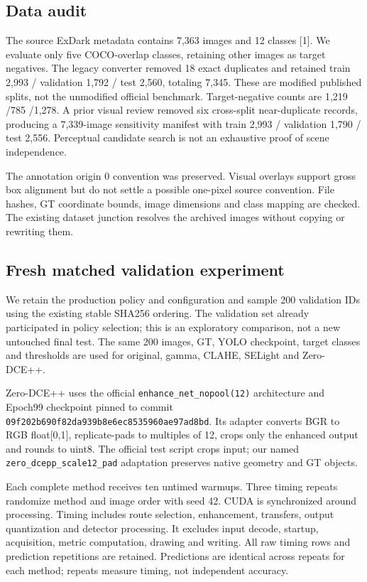 \documentclass[11pt,a4paper]{article}
\begin{document}
\subsection{Data audit}

The source ExDark metadata contains 7,363 images and 12 classes [1]. We evaluate only five COCO-overlap classes, retaining other images as target negatives. The legacy converter removed 18 exact duplicates and retained train 2,993 / validation 1,792 / test 2,560, totaling 7,345. These are modified published splits, not the unmodified official benchmark. Target-negative counts are 1,219 /785 /1,278. A prior visual review removed six cross-split near-duplicate records, producing a 7,339-image sensitivity manifest with train 2,993 / validation 1,790 / test 2,556. Perceptual candidate search is not an exhaustive proof of scene independence.


The annotation origin 0 convention was preserved. Visual overlays support gross box alignment but do not settle a possible one-pixel source convention. File hashes, GT coordinate bounds, image dimensions and class mapping are checked. The existing dataset junction resolves the archived images without copying or rewriting them.


\subsection{Fresh matched validation experiment}

We retain the production policy and configuration and sample 200 validation IDs using the existing stable SHA256 ordering. The validation set already participated in policy selection; this is an exploratory comparison, not a new untouched final test. The same 200 images, GT, YOLO checkpoint, target classes and thresholds are used for original, gamma, CLAHE, SELight and Zero-DCE++.


Zero-DCE++ uses the official \texttt{enhance\_net\_nopool(12)} architecture and Epoch99 checkpoint pinned to commit \texttt{09f202b690f82da939b8e6ec8535960ae97ad8bd}. Its adapter converts BGR to RGB float[0,1], replicate-pads to multiples of 12, crops only the enhanced output and rounds to uint8. The official test script crops input; our named \texttt{zero\_dcepp\_scale12\_pad} adaptation preserves native geometry and GT objects.


Each complete method receives ten untimed warmups. Three timing repeats randomize method and image order with seed 42. CUDA is synchronized around processing. Timing includes route selection, enhancement, transfers, output quantization and detector processing. It excludes input decode, startup, acquisition, metric computation, drawing and writing. All raw timing rows and prediction repetitions are retained. Predictions are identical across repeats for each method; repeats measure timing, not independent accuracy.
\end{document}
